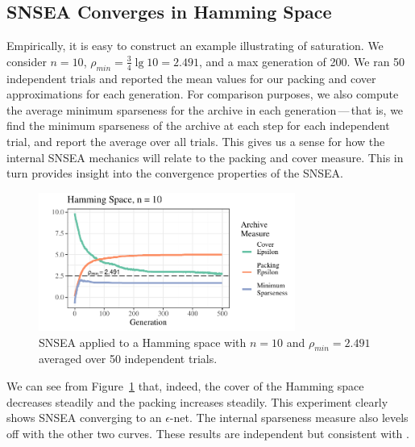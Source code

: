 \documentclass[twoside]{article}
\begin{document}
\subsection{SNSEA Converges in Hamming Space}
\label{subsec:hamming}

Empirically, it is easy to construct an example illustrating of saturation.  We consider $n=10$, $\rho_{min} = \frac{3}{4} \lg 10 = 2.491$, and a max generation of 200.  We ran 50 independent trials and reported the mean values for our packing and cover approximations for each generation.  For comparison purposes, we also compute the average minimum sparseness for the archive in each generation\,---\,that is, we find the minimum sparseness of the archive at each step for each independent trial, and report the average over all trials.  This gives us a sense for how the internal SNSEA mechanics will relate to the packing and cover measure.  This in turn provides insight into the convergence properties of the SNSEA.
%
\begin{figure}[t]
  \center\includegraphics[width=0.75\textwidth]{Figures/hamming-500-n10-NOPOP.pdf}
  \caption{\label{fig:hamming:nopop:n10} SNSEA applied to a Hamming space with $n=10$ and $\rho_{min} = 2.491$ averaged over 50 independent trials.}
\end{figure}
%
We can see from Figure~\ref{fig:hamming:nopop:n10} that, indeed, the cover of the Hamming space decreases steadily and the packing increases steadily.  This experiment clearly shows SNSEA converging to an $\epsilon$-net.  The internal sparseness measure also levels off with the other two curves.  These results are independent but consistent with \citep{Wiegand2020flairs}.  
\end{document}
